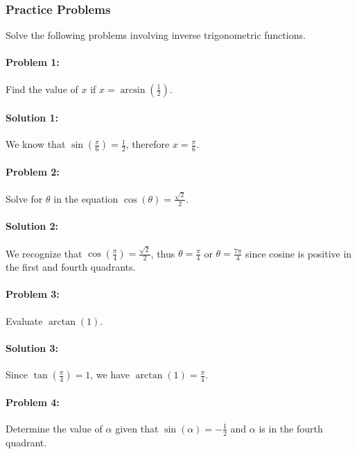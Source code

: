 \documentclass[a4paper,12pt]{book}
\newcounter{problem}
\begin{document}

\subsubsection{Practice Problems}
Solve the following problems involving inverse trigonometric functions.

\paragraph{Problem 1:} Find the value of $x$ if $x = \arcsin(\frac{1}{2})$.

\paragraph{Solution 1:}
We know that $\sin\left(\frac{\pi}{6}\right) = \frac{1}{2}$, therefore $x = \frac{\pi}{6}$.

\paragraph{Problem 2:} Solve for $\theta$ in the equation $\cos(\theta) = \frac{\sqrt{2}}{2}$.

\paragraph{Solution 2:}
We recognize that $\cos\left(\frac{\pi}{4}\right) = \frac{\sqrt{2}}{2}$, thus $\theta = \frac{\pi}{4}$ or $\theta = \frac{7\pi}{4}$ since cosine is positive in the first and fourth quadrants.

\paragraph{Problem 3:} Evaluate $\arctan(1)$.

\paragraph{Solution 3:}
Since $\tan\left(\frac{\pi}{4}\right) = 1$, we have $\arctan(1) = \frac{\pi}{4}$.

\paragraph{Problem 4:} Determine the value of $\alpha$ given that $\sin(\alpha) = -\frac{1}{2}$ and $\alpha$ is in the fourth quadrant.
\end{document}
